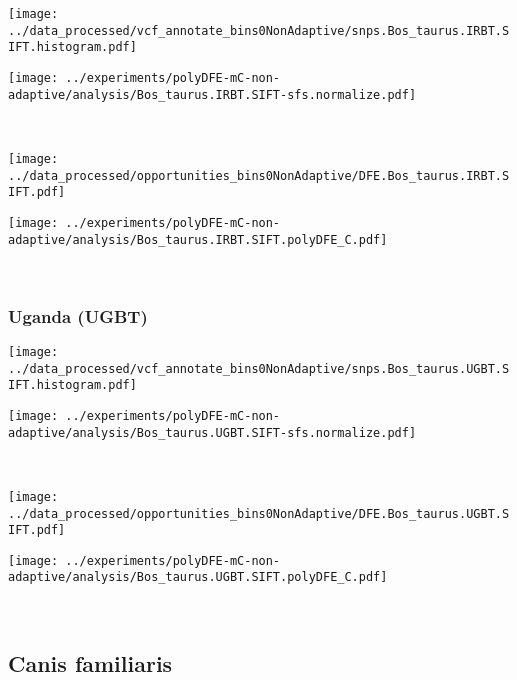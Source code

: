 \begin{minipage}{0.49\linewidth}
    \texttt{[image: ../data\_processed/vcf\_annotate\_bins0NonAdaptive/snps.Bos\_taurus.IRBT.SIFT.histogram.pdf]}
\end{minipage}
\begin{minipage}{0.49\linewidth}
    \texttt{[image: ../experiments/polyDFE-mC-non-adaptive/analysis/Bos\_taurus.IRBT.SIFT-sfs.normalize.pdf]}
\end{minipage}
\\
\begin{minipage}{0.49\linewidth}
    \texttt{[image: ../data\_processed/opportunities\_bins0NonAdaptive/DFE.Bos\_taurus.IRBT.SIFT.pdf]}
\end{minipage}
\begin{minipage}{0.49\linewidth}
    \texttt{[image: ../experiments/polyDFE-mC-non-adaptive/analysis/Bos\_taurus.IRBT.SIFT.polyDFE\_C.pdf]}
\end{minipage}
\\

\subsubsection{Uganda (UGBT)}

\begin{minipage}{0.49\linewidth}
    \texttt{[image: ../data\_processed/vcf\_annotate\_bins0NonAdaptive/snps.Bos\_taurus.UGBT.SIFT.histogram.pdf]}
\end{minipage}
\begin{minipage}{0.49\linewidth}
    \texttt{[image: ../experiments/polyDFE-mC-non-adaptive/analysis/Bos\_taurus.UGBT.SIFT-sfs.normalize.pdf]}
\end{minipage}
\\
\begin{minipage}{0.49\linewidth}
    \texttt{[image: ../data\_processed/opportunities\_bins0NonAdaptive/DFE.Bos\_taurus.UGBT.SIFT.pdf]}
\end{minipage}
\begin{minipage}{0.49\linewidth}
    \texttt{[image: ../experiments/polyDFE-mC-non-adaptive/analysis/Bos\_taurus.UGBT.SIFT.polyDFE\_C.pdf]}
\end{minipage}
\\

\subsection{Canis familiaris}

